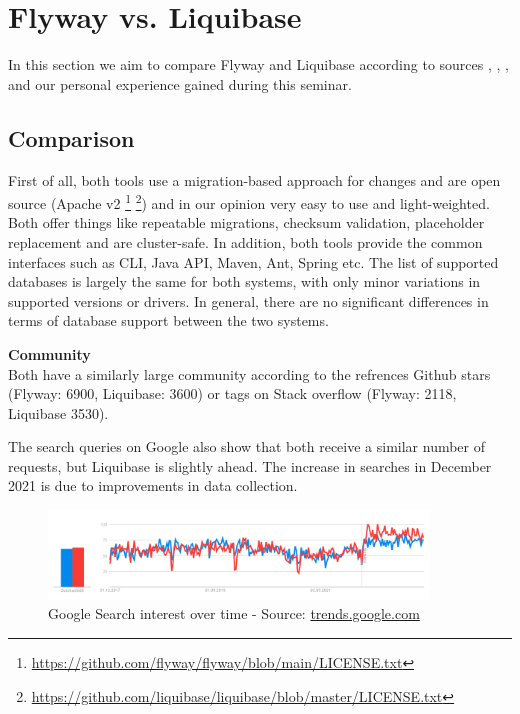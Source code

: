 

\chapter{Flyway vs. Liquibase}

In this section we aim to compare Flyway and Liquibase according to sources \cite{Parsick2018}, \cite{Kaps2016}, \cite{LiquibaseVSFlyway}, \cite{Zylinski2022} and our personal experience gained during this seminar.\\

\section{Comparison}
%
First of all, both tools use a migration-based approach for changes and are open source (Apache v2  \footnote{\url{https://github.com/flyway/flyway/blob/main/LICENSE.txt}} \footnote{\url{https://github.com/liquibase/liquibase/blob/master/LICENSE.txt}}) and in our opinion very easy to use and light-weighted.
Both offer things like repeatable migrations, checksum validation, placeholder replacement and are cluster-safe.
In addition, both tools provide the common interfaces such as CLI, Java API, Maven, Ant, Spring etc.
The list of supported databases is largely the same for both systems, with only minor variations in supported versions or drivers. In general, there are no significant differences in terms of database support between the two systems.


%
\textbf{Community}\\
Both have a similarly large community according to the refrences Github stars (Flyway: 6900, Liquibase: 3600) or tags on Stack overflow (Flyway: 2118, Liquibase 3530). 

The search queries on Google also show that both receive a similar number of requests, but Liquibase is slightly ahead. The increase in searches in December 2021 is due to improvements in data collection. 
\begin{figure}[H]
	\centering
	\includegraphics[width=0.9\textwidth]{./chapters/flyway_vs_liquibase/images/flyway_liquibase_search_history}
	\caption[Google Search interest over time - Source: Google Trends]{Google Search interest over time - Source: \url{trends.google.com}}
\end{figure}


